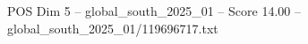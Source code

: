 \begin{textsample}{POS Dim 5 – global\_south\_2025\_01 – Score 14.00 – global\_south\_2025\_01/119696717.txt}
\end{textsample}
